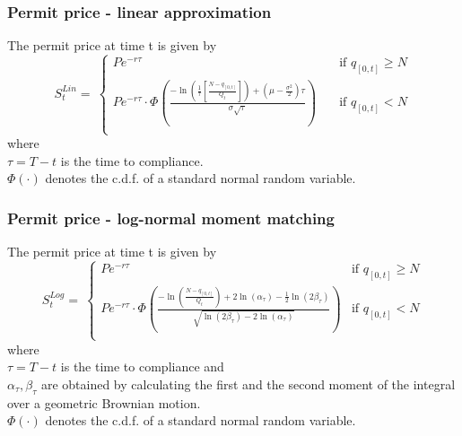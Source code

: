 \begin{frame}
  \frametitle{Permit price - linear approximation}
    \begin{block}{}
    The permit price at time t is given by
  $$
  S_t^{Lin} = \ \left\{
         \begin{array}{ll}
            P e^{-r\tau}
            & \quad \mbox{if $q_{[0,t]} \ge N$} \\
            P e^{-r\tau} \cdot \Phi \left(\frac{-\ln\left( \frac{1}{\tau} \left[ \frac{N - q_{[0,t]}}{Q_t} \right] \right) + \left( \mu - \frac{\sigma^2}{2}\right)\tau}{\sigma \sqrt{\tau}} \right) & \quad \mbox{if $q_{[0,t]} < N$} \\
         \end{array} \right.
$$
where \\
$\tau = T - t$ is the time to compliance. \\
$\Phi(\cdot)$ denotes the c.d.f. of a standard normal random variable.
    \end{block}
\end{frame}

\begin{frame}
  \frametitle{Permit price - log-normal moment matching}
    \begin{block}{}
    The permit price at time t is given by
$$
S_t^{Log} = \ \left\{
         \begin{array}{ll}
            P e^{-r\tau}
            &\mbox{if $q_{[0,t]} \ge N$} \\
            P e^{-r\tau} \cdot \Phi \left(\frac{-\ln\left( \frac{N - q_{[0,t]}}{Q_t} \right) + 2\ln(\alpha_{\tau}) - \frac{1}{2} \ln(2\beta_{\tau})}{\sqrt{\ln(2\beta_{\tau}) - 2\ln(\alpha_{\tau})}} \right) & \mbox{if $q_{[0,t]} < N$} \\
         \end{array} \right.
$$
where \\
$\tau = T - t$ is the time to compliance and \\
$\alpha_{\tau}, \beta_{\tau}$ are obtained by calculating the first and the second moment of the integral over a geometric Brownian motion. \\
$\Phi(\cdot)$ denotes the c.d.f. of a standard normal random variable.
    \end{block}
\end{frame}

